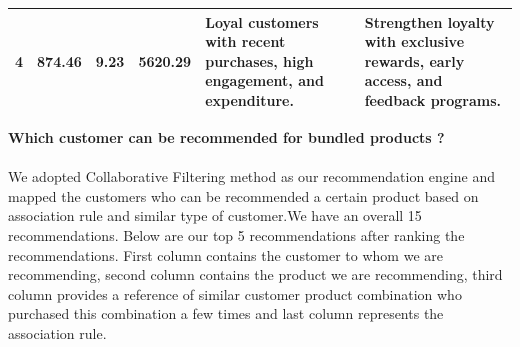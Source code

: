 \documentclass[11pt]{article} %
\begin{document}
\begin{table}[H]
\begin{tabular}{@{}llllp{4cm}p{4cm}@{}}
4                & 874.46                                                                  & 9.23               & 5620.29                                                                      & Loyal customers with recent purchases, high engagement, and   expenditure.                                            & Strengthen loyalty with exclusive rewards, early access, and feedback   programs.                                                   \\ \bottomrule
\end{tabular}
\end{table}
\clearpage
\textbf{Which customer can be recommended for bundled products ?}\\\\
We adopted Collaborative Filtering method as our recommendation engine and mapped the customers who can be recommended a certain product based on association rule and similar type of customer.We have an overall 15 recommendations. Below are our top 5 recommendations after ranking the recommendations. First column contains the customer to whom we are recommending, second column contains the product we are recommending, third column provides a reference of similar customer product combination who purchased this combination a few times and last column represents the association rule.
\end{document}
